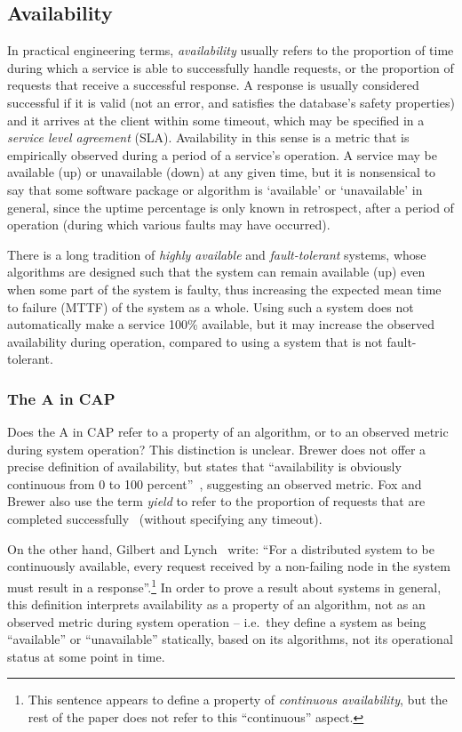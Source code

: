 \documentclass[a4paper,twocolumn,10pt]{article}
\begin{document}
\subsection{Availability}\label{sec:availability}

In practical engineering terms, \emph{availability} usually refers to the proportion of time during
which a service is able to successfully handle requests, or the proportion of requests that receive
a successful response. A response is usually considered successful if it is valid (not an error, and
satisfies the database's safety properties) and it arrives at the client within some timeout, which
may be specified in a \emph{service level agreement} (SLA). Availability in this sense is a metric
that is empirically observed during a period of a service's operation. A service may be available
(up) or unavailable (down) at any given time, but it is nonsensical to say that some software
package or algorithm is `available' or `unavailable' in general, since the uptime percentage is only
known in retrospect, after a period of operation (during which various faults may have occurred).

There is a long tradition of \emph{highly available} and \emph{fault-tolerant} systems, whose
algorithms are designed such that the system can remain available (up) even when some part of the
system is faulty, thus increasing the expected mean time to failure (MTTF) of the system as a whole.
Using such a system does not automatically make a service 100\% available, but it may increase the
observed availability during operation, compared to using a system that is not fault-tolerant.

\subsubsection{The A in CAP}\label{sec:a-in-cap}

Does the A in CAP refer to a property of an algorithm, or to an observed metric during system
operation? This distinction is unclear. Brewer does not offer a precise definition of availability,
but states that ``availability is obviously continuous from 0 to 100 percent''~\cite{Brewer2012ba},
suggesting an observed metric. Fox and Brewer also use the term \emph{yield} to refer to the
proportion of requests that are completed successfully~\cite{Fox1999bs} (without specifying any
timeout).

On the other hand, Gilbert and Lynch~\cite{Gilbert2002il} write: ``For a distributed system to be
continuously available, every request received by a non-failing node in the system must result in a
response''.\footnote{This sentence appears to define a property of \emph{continuous availability},
but the rest of the paper does not refer to this ``continuous'' aspect.} In order to prove a result
about systems in general, this definition interprets availability as a property of an algorithm, not
as an observed metric during system operation -- i.e.\ they define a system as being ``available''
or ``unavailable'' statically, based on its algorithms, not its operational status at some point in
time.
\end{document}
